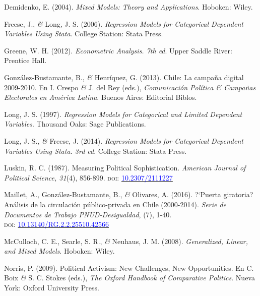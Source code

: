 \documentclass[a4paper]{tufte-handout}
\begin{document}
{{{{{{{{{{{{{\begin{list}{}
\item{\small Demidenko, E. (2004). {\itshape Mixed Models: Theory and Applications}. Hoboken: Wiley.}

\item{\small Freese, J., {\itshape \&} Long, J. S. (2006). {\itshape Regression Models for Categorical Dependent Variables Using Stata}. College Station: Stata Press.}

\item{\small Greene, W. H. (2012). {\itshape Econometric Analysis. 7th ed}. Upper Saddle River: Prentice Hall.}

\item{\small González-Bustamante, B., {\itshape \&} Henríquez, G. (2013). Chile: La campaña digital 2009-2010. En I. Crespo {\itshape \&} J. del Rey (eds.), {\itshape Comunicación Política \& Campañas Electorales en América Latina}. Buenos Aires: Editorial Biblos.}

\item{\small Long, J. S. (1997). {\itshape Regression Models for Categorical and Limited Dependent Variables}. Thousand Oaks: Sage Publications.}

\item{\small Long, J. S., {\itshape \&} Freese, J. (2014). {\itshape Regression Models for Categorical Dependent Variables Using Stata. 3rd ed}. College Station: Stata Press.}

\item{\small Luskin, R. C. (1987). Measuring Political Sophistication. {\itshape American Journal of Political Science, 31}(4), 856-899. {\scshape doi:} \href{http://doi.org/10.2307/2111227}{\textcolor{blue}{10.2307/2111227}}}

\item{\small Maillet, A., Gonz\'alez-Bustamante, B., {\itshape \&} Olivares, A. (2016). ?`Puerta giratoria? An\'alisis de la circulaci\'on p\'ublico-privada en Chile (2000-2014). {\itshape Serie de Documentos de Trabajo PNUD-Desigualdad}, (7),  1-40. \\ {\scshape doi:} \href{https://doi.org/10.13140/RG.2.2.25510.42566}{\textcolor{blue}{10.13140/RG.2.2.25510.42566}}}

\item{\small McCulloch, C. E., Searle, S. R., {\itshape \&} Neuhaus, J. M. (2008). {\itshape Generalized, Linear, and Mixed Models}. Hoboken: Wiley.}

\item{\small Norris, P. (2009). Political Activism: New Challenges, New Opportunities. En C. Boix {\itshape \&} S. C. Stokes (eds.), {\itshape The Oxford Handbook of Comparative Politics}. Nueva York: Oxford University Press.}


\end{list}}}}}}}}}}}}}}
\end{document}
